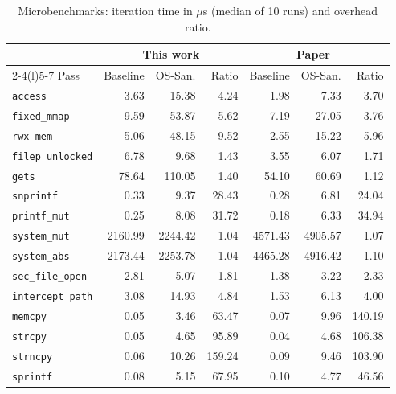 \documentclass[11pt,a4paper]{article}
\newcommand{\pass}[1]{\texttt{#1}}
\begin{document}
\begin{table}[H]
\centering\small
\caption{Microbenchmarks: iteration time in $\mu$s (median of 10 runs) and overhead ratio.}
\label{tab:t2}
\begin{tabular}{@{}l rrr rrr@{}}
\toprule
& \multicolumn{3}{c}{This work} & \multicolumn{3}{c}{Paper~\cite{ossan}} \\
\cmidrule(lr){2-4}\cmidrule(l){5-7}
Pass & Baseline & OS-San. & Ratio & Baseline & OS-San. & Ratio \\
\midrule
\pass{access}         & 3.63    & 15.38   & 4.24   & 1.98    & 7.33    & 3.70 \\
\pass{fixed\_mmap}    & 9.59    & 53.87   & 5.62   & 7.19    & 27.05   & 3.76 \\
\pass{rwx\_mem}       & 5.06    & 48.15   & 9.52   & 2.55    & 15.22   & 5.96 \\
\pass{filep\_unlocked}& 6.78    & 9.68    & 1.43   & 3.55    & 6.07    & 1.71 \\
\pass{gets}           & 78.64   & 110.05  & 1.40   & 54.10   & 60.69   & 1.12 \\
\pass{snprintf}       & 0.33    & 9.37    & 28.43  & 0.28    & 6.81    & 24.04 \\
\pass{printf\_mut}    & 0.25    & 8.08    & 31.72  & 0.18    & 6.33    & 34.94 \\
\pass{system\_mut}    & 2160.99 & 2244.42 & 1.04   & 4571.43 & 4905.57 & 1.07 \\
\pass{system\_abs}    & 2173.44 & 2253.78 & 1.04   & 4465.28 & 4916.42 & 1.10 \\
\pass{sec\_file\_open}& 2.81    & 5.07    & 1.81   & 1.38    & 3.22    & 2.33 \\
\pass{intercept\_path}& 3.08    & 14.93   & 4.84   & 1.53    & 6.13    & 4.00 \\
\midrule
\pass{memcpy}         & 0.05    & 3.46    & 63.47  & 0.07    & 9.96    & 140.19 \\
\pass{strcpy}         & 0.05    & 4.65    & 95.89  & 0.04    & 4.68    & 106.38 \\
\pass{strncpy}        & 0.06    & 10.26   & 159.24 & 0.09    & 9.46    & 103.90 \\
\pass{sprintf}        & 0.08    & 5.15    & 67.95  & 0.10    & 4.77    & 46.56 \\
\bottomrule
\end{tabular}
\end{table}
\end{document}
